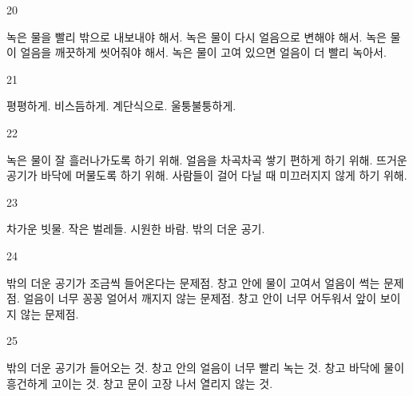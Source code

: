 \documentclass[fs9,seriesFre]{korfarm-base}
\begin{document}
\begin{kfSentenceUnit}{20}{}
\begin{kfChoices}
\kfChoice 녹은 물을 빨리 밖으로 내보내야 해서.
\kfChoice 녹은 물이 다시 얼음으로 변해야 해서.
\kfChoice 녹은 물이 얼음을 깨끗하게 씻어줘야 해서.
\kfChoice 녹은 물이 고여 있으면 얼음이 더 빨리 녹아서.
\end{kfChoices}
\end{kfSentenceUnit}

\begin{kfSentenceUnit}{21}{}
\begin{kfChoices}
\kfChoice 평평하게.
\kfChoice 비스듬하게.
\kfChoice 계단식으로.
\kfChoice 울퉁불퉁하게.
\end{kfChoices}
\end{kfSentenceUnit}

\begin{kfSentenceUnit}{22}{}
\begin{kfChoices}
\kfChoice 녹은 물이 잘 흘러나가도록 하기 위해.
\kfChoice 얼음을 차곡차곡 쌓기 편하게 하기 위해.
\kfChoice 뜨거운 공기가 바닥에 머물도록 하기 위해.
\kfChoice 사람들이 걸어 다닐 때 미끄러지지 않게 하기 위해.
\end{kfChoices}
\end{kfSentenceUnit}

\begin{kfSentenceUnit}{23}{}
\begin{kfChoices}
\kfChoice 차가운 빗물.
\kfChoice 작은 벌레들.
\kfChoice 시원한 바람.
\kfChoice 밖의 더운 공기.
\end{kfChoices}
\end{kfSentenceUnit}

\begin{kfSentenceUnit}{24}{}
\begin{kfChoices}
\kfChoice 밖의 더운 공기가 조금씩 들어온다는 문제점.
\kfChoice 창고 안에 물이 고여서 얼음이 썩는 문제점.
\kfChoice 얼음이 너무 꽁꽁 얼어서 깨지지 않는 문제점.
\kfChoice 창고 안이 너무 어두워서 앞이 보이지 않는 문제점.
\end{kfChoices}
\end{kfSentenceUnit}

\begin{kfSentenceUnit}{25}{}
\begin{kfChoices}
\kfChoice 밖의 더운 공기가 들어오는 것.
\kfChoice 창고 안의 얼음이 너무 빨리 녹는 것.
\kfChoice 창고 바닥에 물이 흥건하게 고이는 것.
\kfChoice 창고 문이 고장 나서 열리지 않는 것.
\end{kfChoices}
\end{kfSentenceUnit}
\end{document}
